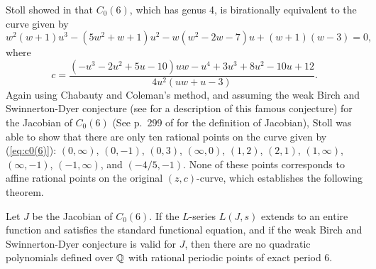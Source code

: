 Stoll showed in \cite{MR2465796} that $C_0(6)$, which has genus 4, is
birationally equivalent to the curve given by
\begin{equation}
  \label{eq:c0(6)}
  w^2(w+1)u^3 - (5w^2+w+1)u^2 - w(w^2-2w-7)u + (w+1)(w-3) = 0,
\end{equation}
where
\begin{equation}
  \label{eq:c-in-uw}
  c = \frac{(- u^3 - 2u^2 + 5u - 10)uw - u^4 + 3u^3 + 8u^2 - 10u +
    12}{4u^2(uw+u-3)}.
\end{equation}
Again using Chabauty and Coleman's method, and assuming the weak Birch
and Swinnerton-Dyer conjecture (see \cite{MR2238272} for a description
of this famous conjecture) for the Jacobian of $C_0(6)$ (See p.~299 of
\cite{MR1917232} for the definition of Jacobian), Stoll was able to
show that there are only ten rational points on the curve given by
(\ref{eq:c0(6)}): $(0, \infty)$, $(0, -1)$, $(0, 3)$, $(\infty, 0)$,
$(1, 2)$, $(2, 1)$, $(1, \infty)$, $(\infty, -1)$, $(-1, \infty)$, and
$(-4/5, -1)$. None of these points corresponds to affine rational
points on the original $(z, c)$-curve, which establishes the following
theorem.

\begin{theorem}
  Let $J$ be the Jacobian of $C_0(6)$. If the $L$-series $L(J,s)$
  extends to an entire function and satisfies the standard functional
  equation, and if the weak Birch and Swinnerton-Dyer conjecture is
  valid for $J$, then there are no quadratic polynomials defined over
  $\mathbb{Q}$ with rational periodic points of exact period 6.
\end{theorem}


